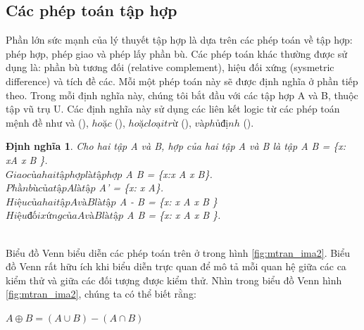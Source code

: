 \documentclass[11pt,a4paper,oneside]{article}
\newtheorem{modeling_def}{Định nghĩa }
\begin{document}
\subsection{Các phép toán tập hợp}
Phần lớn sức mạnh của lý thuyết tập hợp là dựa trên các phép toán về tập hợp: phép hợp, phép giao và phép lấy phần bù. Các phép toán khác thường được sử dụng là: phần bù tương đối (relative complement), hiệu đối xứng (sysmetric difference) và tích đề các. Mỗi một phép toán này sẽ được định nghĩa ở phần tiếp theo. Trong mỗi định nghĩa này, chúng tôi bắt đầu với các tập hợp A và B, thuộc tập vũ trụ U. Các định nghĩa này sử dụng các liên kết logic từ các phép toán mệnh đề như và \left(\wedge\right), $hoặc$ \left(\lor\right), $hoặc loại trừ$ \left(\oplus\right), $và phủ định$ \left(\neg\right).

\begin{modeling_def}
Cho hai tập A và B, hợp của hai tập A và B là tập A \cup B = \left\{x: x\in A \vee x \in B \right\}.\\
$Giao của hai tập hợp là tập hợp $ A \cap B = \left\{x:x \in A \land x \in B\right\}.\\
$Phần bù của tập A là tập $ A{'} = \left\{x: x \notin A\right\}.\\
$Hiệu của hai tập A và B là tập $ A - B = \left\{x: x \in A \land x \notin B \right\}\\
$Hiệu đối xứng của A và B là tập $ A \oplus B = \left\{x: x \in A \oplus x \in B \right\}.
\end{modeling_def}
\\
\newline
Biểu đồ Venn biểu diễn các phép toán trên ở trong hình \ref{fig:mtran_ima2}. Biểu đồ Venn rất hữu ích khi biểu diễn trực quan để mô tả mỗi quan hệ giữa các ca kiểm thử và giữa các đối tượng được kiểm thử. Nhìn trong biểu đồ Venn hình \ref{fig:mtran_ima2}, chúng ta có thể biết rằng:

\begin{center}
$A \oplus B = (A \cup B) - (A \cap B)$
\end{center}
\end{document}
